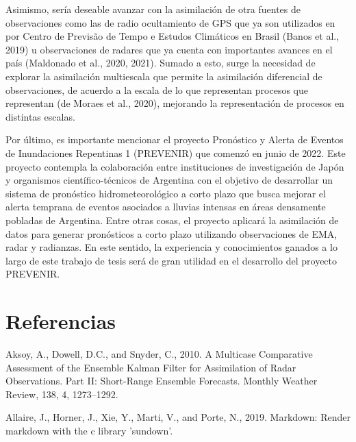 \documentclass[12pt,oneside,a4paper]{reedthesis}
\begin{document}
Asimismo, sería deseable avanzar con la asimilación de otra fuentes de observaciones como las de radio ocultamiento de GPS que ya son utilizados en por Centro de Previsão de Tempo e Estudos Climáticos en Brasil (Banos et al., 2019) u observaciones de radares que ya cuenta con importantes avances en el país (Maldonado et al., 2020, 2021). Sumado a esto, surge la necesidad de explorar la asimilación multiescala que permite la asimilación diferencial de observaciones, de acuerdo a la escala de lo que representan procesos que representan (de Moraes et al., 2020), mejorando la representación de procesos en distintas escalas.

Por último, es importante mencionar el proyecto Pronóstico y Alerta de Eventos de Inundaciones Repentinas 1 (PREVENIR) que comenzó en junio de 2022. Este proyecto contempla la colaboración entre instituciones de investigación de Japón y organismos científico-técnicos de
Argentina con el objetivo de desarrollar un sistema de pronóstico hidrometeorológico a corto plazo que busca mejorar el alerta temprana de eventos asociados a lluvias intensas en áreas densamente pobladas de Argentina. Entre otras cosas, el proyecto aplicará la asimilación de datos para generar pronósticos a corto plazo utilizando observaciones de EMA, radar y radianzas. En este sentido, la experiencia y conocimientos ganados a lo largo de este trabajo de tesis será de gran utilidad en el desarrollo del proyecto PREVENIR.

\backmatter

\hypertarget{referencias}{%
\chapter*{Referencias}\label{referencias}}


\noindent

\setlength{\parindent}{-0.20in}

\hypertarget{refs}{}
\leavevmode\hypertarget{ref-aksoy2010}{}%
Aksoy, A., Dowell, D.C., and Snyder, C., 2010. A Multicase Comparative Assessment of the Ensemble Kalman Filter for Assimilation of Radar Observations. Part II: Short-Range Ensemble Forecasts. Monthly Weather Review, 138, 4, 1273--1292.

\leavevmode\hypertarget{ref-allaire2019}{}%
Allaire, J., Horner, J., Xie, Y., Marti, V., and Porte, N., 2019. Markdown: Render markdown with the c library 'sundown'.
\end{document}
